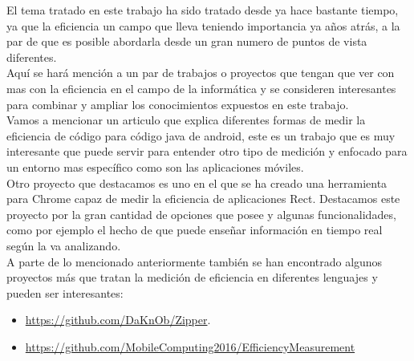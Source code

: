 
El tema tratado en este trabajo ha sido tratado desde ya  hace bastante tiempo, ya que la eficiencia un campo que lleva teniendo importancia ya años atrás, a la par de que es posible abordarla desde un gran numero de puntos de vista diferentes.\\

Aquí se hará mención a un par de trabajos o proyectos que tengan que ver con mas con la eficiencia en el campo de la informática y se consideren interesantes para combinar y ampliar los conocimientos expuestos en este trabajo.\\

Vamos a mencionar un articulo que explica diferentes formas de medir la eficiencia de código para código java de android, este es un trabajo que es muy interesante que puede servir para entender otro tipo de medición y enfocado para un entorno mas específico como son las aplicaciones móviles\cite{trabajo1}.\\
 

Otro proyecto que destacamos es uno en el que se ha creado una herramienta para Chrome capaz de medir la eficiencia de aplicaciones Rect. Destacamos este proyecto por la gran cantidad de opciones que posee y algunas funcionalidades, como por ejemplo el hecho de que puede enseñar información en tiempo real según la va analizando\cite{trabajo2}.\\


A parte de lo mencionado anteriormente también se han encontrado algunos proyectos más que tratan la medición de eficiencia en diferentes lenguajes y pueden ser interesantes:\\
\begin{itemize}
	\item \url{https://github.com/DaKnOb/Zipper}.
	\item \url{https://github.com/MobileComputing2016/EfficiencyMeasurement}
\end{itemize}


